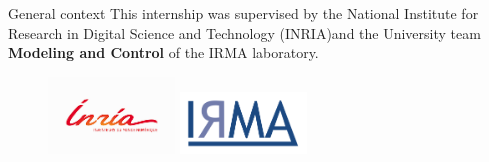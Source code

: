 \begin{frame}{General context}
    This internship was supervised by the National Institute for  Research in Digital Science and Technology (INRIA)and the University team \textbf{Modeling and Control} of the IRMA laboratory. 
    \begin{figure}
        \centering
        \includegraphics[width=0.3\textwidth]{images/inria.png}
        \includegraphics[width=0.3\textwidth]{images/logo_irma.png}
    \end{figure}

\end{frame}